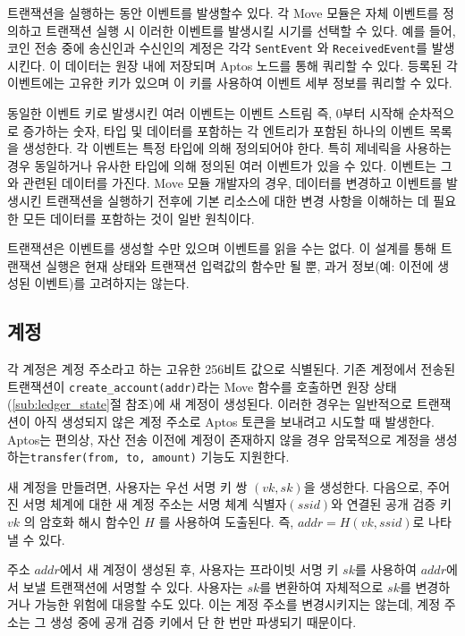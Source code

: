 \documentclass{article}
\begin{document}
트랜잭션을 실행하는 동안 이벤트를 발생할수 있다. 각 Move 모듈은 자체 이벤트를 정의하고 트랜잭션 실행 시 이러한 이벤트를 발생시킬 시기를 선택할 수 있다. 예를 들어, 코인 전송 중에 송신인과 수신인의 계정은 각각 \texttt{SentEvent} 와 \texttt{ReceivedEvent}를 발생시킨다. 이 데이터는 원장 내에 저장되며 Aptos 노드를 통해 쿼리할 수 있다. 등록된 각 이벤트에는 고유한 키가 있으며 이 키를 사용하여 이벤트 세부 정보를 쿼리할 수 있다.

동일한 이벤트 키로 발생시킨 여러 이벤트는 이벤트 스트림 즉, 0부터 시작해 순차적으로 증가하는 숫자, 타입 및 데이터를 포함하는 각 엔트리가 포함된 하나의 이벤트 목록을 생성한다. 각 이벤트는 특정 타입에 의해 정의되어야 한다. 특히 제네릭을 사용하는 경우 동일하거나 유사한 타입에 의해 정의된 여러 이벤트가 있을 수 있다. 이벤트는 그와 관련된 데이터를 가진다. Move 모듈 개발자의 경우, 데이터를 변경하고 이벤트를 발생시킨 트랜잭션을 실행하기 전후에 기본 리소스에 대한 변경 사항을 이해하는 데 필요한 모든 데이터를 포함하는 것이 일반 원칙이다.

트랜잭션은 이벤트를 생성할 수만 있으며 이벤트를 읽을 수는 없다. 이 설계를 통해 트랜잭션 실행은 현재 상태와 트랜잭션 입력값의 함수만 될 뿐, 과거 정보(예: 이전에 생성된 이벤트)를 고려하지는 않는다.

\subsection{계정}
\label{sec:accounts}

각 계정은 계정 주소라고 하는 고유한 256비트 값으로 식별된다. 기존 계정에서 전송된 트랜잭션이 \texttt{create_account(addr)}라는 Move 함수를 호출하면 원장 상태(\ref{sub:ledger_state}절 참조)에 새 계정이 생성된다. 이러한 경우는 일반적으로 트랜잭션이 아직 생성되지 않은 계정 주소로 Aptos 토큰을 보내려고 시도할 때 발생한다. Aptos는 편의상, 자산 전송 이전에 계정이 존재하지 않을 경우 암묵적으로 계정을 생성하는\texttt{transfer(from, to, amount)} 기능도 지원한다.

새 계정을 만들려면, 사용자는 우선 서명 키 쌍  $(vk, sk)$을 생성한다. 다음으로, 주어진 서명 체계에 대한 새 계정 주소는 서명 체계 식별자$(ssid)$와 연결된 공개 검증 키 $vk$ 의 암호화 해시 함수인 $H$ 를 사용하여 도출된다. 즉, $addr = H(vk, ssid)$로 나타낼 수 있다.

주소 $addr$에서 새 계정이 생성된 후, 사용자는 프라이빗 서명 키 $sk$를 사용하여  $addr$에서 보낼 트랜잭션에 서명할 수 있다. 사용자는 $sk$를 변환하여 자체적으로 $sk$를 변경하거나 가능한 위험에 대응할 수도 있다. 이는 계정 주소를 변경시키지는 않는데, 계정 주소는 그 생성 중에 공개 검증 키에서 단 한 번만 파생되기 때문이다.
\end{document}
